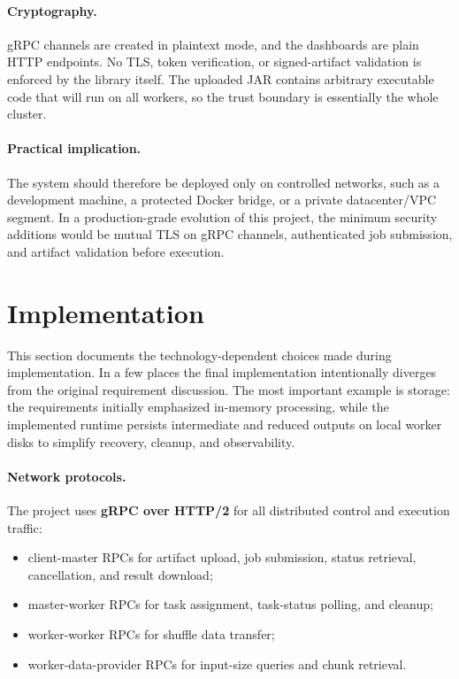 \documentclass{scrartcl}
\begin{document}
\paragraph{Cryptography.}
gRPC channels are created in plaintext mode, and the dashboards are plain HTTP endpoints. No TLS, token verification, or signed-artifact validation is enforced by the library itself. The uploaded JAR contains arbitrary executable code that will run on all workers, so the trust boundary is essentially the whole cluster.

\paragraph{Practical implication.}
The system should therefore be deployed only on controlled networks, such as a development machine, a protected Docker bridge, or a private datacenter/VPC segment. In a production-grade evolution of this project, the minimum security additions would be mutual TLS on gRPC channels, authenticated job submission, and artifact validation before execution.

\section{Implementation}\label{implementation}
This section documents the technology-dependent choices made during implementation. In a few places the final implementation intentionally diverges from the original requirement discussion. The most important example is storage: the requirements initially emphasized in-memory processing, while the implemented runtime persists intermediate and reduced outputs on local worker disks to simplify recovery, cleanup, and observability.

\paragraph{Network protocols.}
The project uses \textbf{gRPC over HTTP/2} for all distributed control and execution traffic:
%
\begin{itemize}
    \item client-master RPCs for artifact upload, job submission, status retrieval, cancellation, and result download;
    \item master-worker RPCs for task assignment, task-status polling, and cleanup;
    \item worker-worker RPCs for shuffle data transfer;
    \item worker-data-provider RPCs for input-size queries and chunk retrieval.
\end{itemize}
\end{document}
